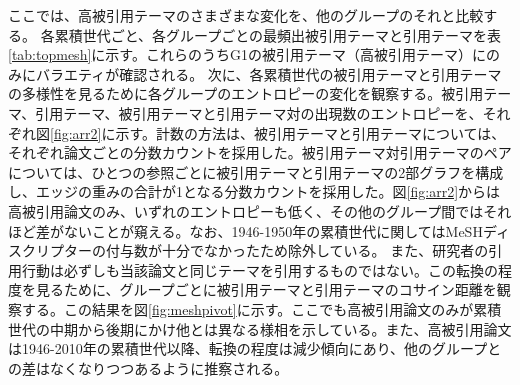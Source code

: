 ここでは、高被引用テーマのさまざまな変化を、他のグループのそれと比較する。
各累積世代ごと、各グループごとの最頻出被引用テーマと引用テーマを表\ref{tab:topmesh}に示す。これらのうちG1の被引用テーマ（高被引用テーマ）にのみにバラエティが確認される。
次に、各累積世代の被引用テーマと引用テーマの多様性を見るために各グループのエントロピーの変化を観察する。被引用テーマ、引用テーマ、被引用テーマと引用テーマ対の出現数のエントロピーを、それぞれ図\ref{fig:arr2}に示す。計数の方法は、被引用テーマと引用テーマについては、それぞれ論文ごとの分数カウントを採用した。被引用テーマ対引用テーマのペアについては、ひとつの参照ごとに被引用テーマと引用テーマの2部グラフを構成し、エッジの重みの合計が1となる分数カウントを採用した。図\ref{fig:arr2}からは高被引用論文のみ、いずれのエントロピーも低く、その他のグループ間ではそれほど差がないことが窺える。なお、1946-1950年の累積世代に関してはMeSHディスクリプターの付与数が十分でなかったため除外している。
また、研究者の引用行動は必ずしも当該論文と同じテーマを引用するものではない。この転換の程度を見るために、グループごとに被引用テーマと引用テーマのコサイン距離を観察する。この結果を図\ref{fig:meshpivot}に示す。ここでも高被引用論文のみが累積世代の中期から後期にかけ他とは異なる様相を示している。また、高被引用論文は1946-2010年の累積世代以降、転換の程度は減少傾向にあり、他のグループとの差はなくなりつつあるように推察される。
